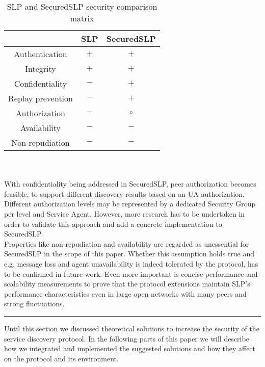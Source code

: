 \begin{table}[!h]
\begin{centering}
\begin{tabular}{|c|c|c|}
\hline 
 & SLP & SecuredSLP
\tabularnewline
\hline
\hline 
Authentication & $+$ & $+$
\tabularnewline
\hline 
Integrity & $+$ & $+$
\tabularnewline
\hline 
Confidentiality & $-$ & $+$
\tabularnewline
\hline 
Replay prevention & $-$ & $+$
\tabularnewline
\hline 
Authorization & $-$ & $\circ$
\tabularnewline
\hline 
Availability & $-$ & $-$
\tabularnewline
\hline 
Non-repudiation & $-$ & $-$
\tabularnewline
\hline
\end{tabular}
\par\end{centering}

\caption{\label{tab:SLP-and-SecuredSLP}SLP and SecuredSLP security comparison matrix}
\end{table}\\\\
With confidentiality being addressed in SecuredSLP, peer authorization becomes feasible, to support different discovery results based on an UA authorization. Different authorization levels may be represented by a dedicated Security Group per level and Service Agent. However, more research has to be undertaken in order to validate this approach and add a concrete implementation to SecuredSLP.\\
Properties like non-repudiation and availability are regarded as unessential for SecuredSLP in the scope of this paper. Whether this assumption holds true and e.g. message loss and agent unavailability is indeed tolerated by the protocol, has to be confirmed in future work. Even more important is concise performance and scalability measurements to prove that the protocol extensions maintain SLP's performance characteristics even in large open networks with many peers and strong fluctuations.\\
\hrule
Until this section we discussed theoretical solutions to increase the security of the service discovery protocol. In the following parts of this paper we will describe how we integrated and implemented the suggested solutions and how they affect on the protocol and its environment.